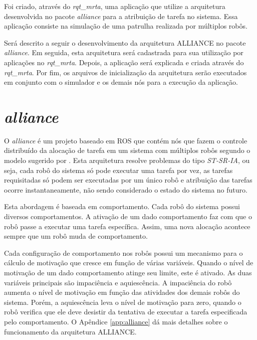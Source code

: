     Foi criado, através do \textit{rqt\_mrta}, uma aplicação que utilize a arquitetura desenvolvida no pacote \textit{alliance} para a atribuição de tarefa no sistema. Essa aplicação consiste na simulação de uma patrulha realizada por múltiplos robôs.
    
    Será descrito a seguir o desenvolvimento da arquitetura ALLIANCE no pacote \textit{alliance}. Em seguida, esta arquitetura será cadastrada para sua utilização por aplicações no \textit{rqt\_mrta}. Depois, a aplicação será explicada e criada através do \textit{rqt\_mrta}. Por fim, os arquivos de inicialização da arquitetura serão executados em conjunto com o simulador e os demais nós para a execução da aplicação.

    \section{\textit{alliance}} \label{sec:alliance}
        O \textit{alliance} é um projeto baseado em ROS que contém nós que fazem o controle distribuído da alocação de tarefa em um sistema com múltiplos robôs segundo o modelo sugerido por . Esta arquitetura resolve problemas do tipo \textit{ST-SR-IA}, ou seja, cada robô do sistema só pode executar uma tarefa por vez, as tarefas requisitadas só podem ser executadas por um único robô e atribuição das tarefas ocorre instantaneamente, não sendo considerado o estado do sistema no futuro.
        
        Esta abordagem é baseada em comportamento. Cada robô do sistema possui diversos comportamentos. A ativação de um dado comportamento faz com que o robô passe a executar uma tarefa específica. Assim, uma nova alocação acontece sempre que um robô muda de comportamento. 
        
        Cada configuração de comportamento nos robôs possui um mecanismo para o cálculo de motivação que cresce em função de várias variáveis. Quando o nível de motivação de um dado comportamento atinge seu limite, este é ativado. As duas variáveis principais são impaciência e aquiescência. A impaciência do robô aumenta o nível de motivação em função das atividades dos demais robôs do sistema. Porém, a aquiescência leva o nível de motivação para zero, quando o robô verifica que ele deve desistir da tentativa de executar a tarefa especificada pelo comportamento. O Apêndice \ref{app:alliance} dá mais detalhes sobre o funcionamento da arquitetura ALLIANCE.
        
